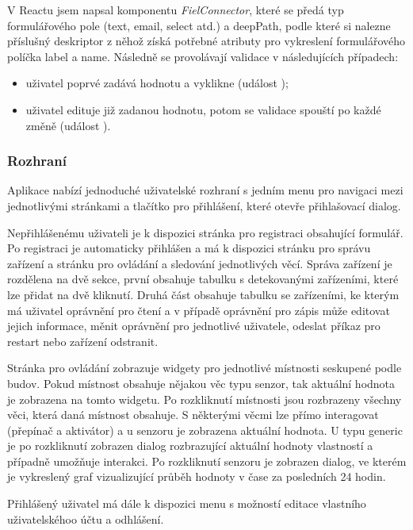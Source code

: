 V Reactu jsem napsal komponentu \textit{FielConnector}, které se předá typ formulářového pole (text, email, select atd.) a deepPath, podle které si nalezne příslušný deskriptor z něhož získá potřebné atributy pro vykreslení formulářového políčka label a name. Následně se provolávají validace v následujících případech:
\begin{itemize}
    \item uživatel poprvé zadává hodnotu a vyklikne (událost );
    \item uživatel edituje již zadanou hodnotu, potom se validace spouští po každé změně (událost ).
\end{itemize}

\subsubsection{Rozhraní}
Aplikace nabízí jednoduché uživatelské rozhraní s jedním menu pro navigaci mezi jednotlivými stránkami a tlačítko pro přihlášení, které otevře přihlašovací dialog.

Nepřihlášenému uživateli je k dispozici stránka pro registraci obsahující formulář. Po registraci je automaticky přihlášen a má k dispozici stránku pro správu zařízení a stránku pro ovládání a sledování jednotlivých věcí. Správa zařízení je rozdělena na dvě sekce, první obsahuje tabulku s detekovanými zařízeními, které lze přidat na dvě kliknutí. Druhá část obsahuje tabulku se zařízeními, ke kterým má uživatel oprávnění pro čtení a v případě oprávnění pro zápis může editovat jejich informace, měnit oprávnění pro jednotlivé uživatele, odeslat příkaz pro restart nebo zařízení odstranit.

Stránka pro ovládání zobrazuje widgety pro jednotlivé místnosti seskupené podle budov. Pokud místnost obsahuje nějakou věc typu senzor, tak aktuální hodnota je zobrazena na tomto widgetu. Po rozkliknutí místnosti jsou rozbrazeny všechny věci, která daná místnost obsahuje. S některými věcmi lze přímo interagovat (přepínač a aktivátor) a u senzoru je zobrazena aktuální hodnota. U typu generic je po rozkliknutí zobrazen dialog rozbrazující aktuální hodnoty vlastností a případně umožňuje interakci. Po rozkliknutí senzoru je zobrazen dialog, ve kterém je vykreslený graf vizualizující průběh hodnoty v čase za posledních 24 hodin.

Přihlášený uživatel má dále k dispozici menu s možností editace vlastního uživatelskéhoo účtu a odhlášení.

